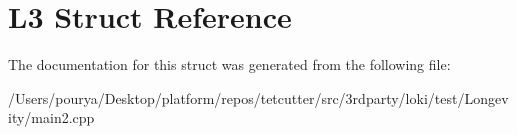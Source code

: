 \hypertarget{structL3}{}\section{L3 Struct Reference}
\label{structL3}


The documentation for this struct was generated from the following file\+:\begin{DoxyCompactItemize}
\item 
/\+Users/pourya/\+Desktop/platform/repos/tetcutter/src/3rdparty/loki/test/\+Longevity/main2.\+cpp\end{DoxyCompactItemize}
